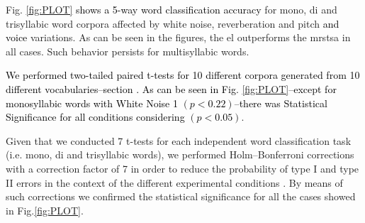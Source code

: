 \documentclass[10pt,letterpaper]{article}
\newcommand{\newreview}[1]{\textcolor{airforceblue}{#1}}
\newcommand{\reviewertwo}[1]{\textcolor{black}{#1}}
\newcommand{\reviewerfour}[1]{\textcolor{black}{#1}}
\begin{document}

Fig. \ref{fig:PLOT}
\reviewertwo{shows a 5-way word classification accuracy} for mono, di and trisyllabic word corpora affected by
white noise, reverberation and pitch \reviewerfour{and voice} variations.
As can be seen in the figures, the \gls{el} outperforms the \gls{mrstsa} in all cases.
Such behavior persists for multisyllabic words.

\reviewertwo{We performed \newreview{two-tailed} paired t-tests for 10 different corpora generated from 10 different vocabularies--section \nameref{CorpGen}. As can be seen in Fig. \ref{fig:PLOT}--except for monosyllabic words with White Noise 1 \newreview{$(p < 0.22)$}--there was Statistical Significance for all conditions considering $(p<0.05)$}.

\newreview{Given that we conducted 7 t-tests for each independent word classification task (i.e. mono, di and trisyllabic words), we performed Holm–Bonferroni corrections with a correction factor of 7 in order to reduce the probability of type I and type II errors in the context of the different experimental conditions \cite{10.1093/biomet/75.2.383}. By means of such corrections we confirmed the statistical significance for all the cases showed in Fig.\ref{fig:PLOT}.}
\end{document}
